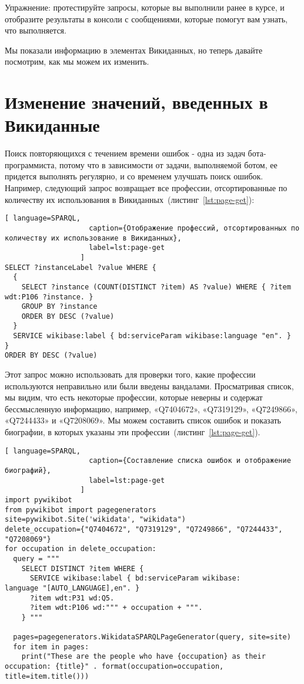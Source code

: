 Упражнение: протестируйте запросы, которые вы выполнили ранее в курсе, и отобразите результаты в консоли с сообщениями, которые помогут вам узнать, что выполняется.

Мы показали информацию в элементах Викиданных, но теперь давайте посмотрим, как мы можем их изменить.

\section{Изменение значений, введенных в Викиданные}
\label{sec:modifying the values entered in Wikidata}

Поиск повторяющихся с течением времени ошибок - одна из задач бота-программиста, потому что в зависимости от задачи, выполняемой ботом, ее придется выполнять регулярно, и со временем улучшать поиск ошибок. Например, следующий запрос возвращает все профессии, отсортированные по количеству их использования в Викиданных~(листинг~\ref{lst:page-get}):

\begin{lstlisting}[ language=SPARQL,
                    caption={Отображение профессий, отсортированных по количеству их использование в Викиданных},
                    label=lst:page-get
                  ]
SELECT ?instanceLabel ?value WHERE {
  {
    SELECT ?instance (COUNT(DISTINCT ?item) AS ?value) WHERE { ?item
wdt:P106 ?instance. }
    GROUP BY ?instance
    ORDER BY DESC (?value)
  }
  SERVICE wikibase:label { bd:serviceParam wikibase:language "en". }
}
ORDER BY DESC (?value)
\end{lstlisting} 

Этот запрос можно использовать для проверки того, какие профессии используются неправильно или были введены вандалами. Просматривая список, мы видим, что есть некоторые профессии, которые неверны и содержат бессмысленную информацию, например, «Q7404672», «Q7319129», «Q7249866», «Q7244433» и «Q7208069». Мы можем составить список ошибок и показать биографии, в которых указаны эти профессии~(листинг~\ref{lst:page-get}).

\begin{lstlisting}[ language=SPARQL,
                    caption={Составление списка ошибок и отображение биографий},
                    label=lst:page-get
                  ]
import pywikibot
from pywikibot import pagegenerators
site=pywikibot.Site('wikidata', "wikidata")
delete_occupation={"Q7404672", "Q7319129", "Q7249866", "Q7244433", 
"Q7208069"}
for occupation in delete_occupation:
  query = """
    SELECT DISTINCT ?item WHERE {
      SERVICE wikibase:label { bd:serviceParam wikibase:
language "[AUTO_LANGUAGE],en". }
      ?item wdt:P31 wd:Q5.
      ?item wdt:P106 wd:""" + occupation + """.
    } """

  pages=pagegenerators.WikidataSPARQLPageGenerator(query, site=site)
  for item in pages:
    print("These are the people who have {occupation} as their 
occupation: {title}" . format(occupation=occupation, 
title=item.title()))
\end{lstlisting} 

